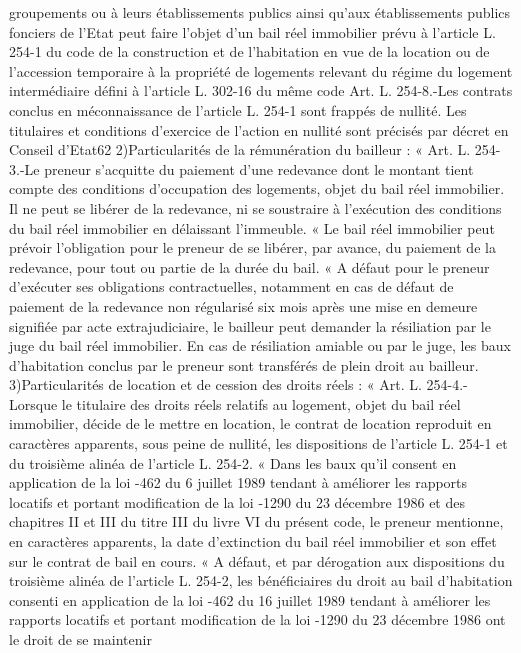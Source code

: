 \documentclass[11pt,a4paper]{report}
\begin{document}
groupements ou à leurs établissements publics ainsi qu'aux établissements publics fonciers de l'Etat peut faire
l'objet d'un bail réel immobilier prévu à l'article L. 254-1 du code de la construction et de l'habitation en vue de
la location ou de l'accession temporaire à la propriété de logements relevant du régime du logement
intermédiaire défini à l'article L. 302-16 du même code
Art. L. 254-8.-Les contrats conclus en méconnaissance de l'article L. 254-1 sont frappés de nullité. Les titulaires
et conditions d'exercice de l'action en nullité sont précisés par décret en Conseil d'Etat62
2)Particularités de la rémunération du bailleur : « Art. L. 254-3.-Le preneur s'acquitte du paiement d'une
redevance dont le montant tient compte des conditions d'occupation des logements, objet du bail réel immobilier.
Il ne peut se libérer de la redevance, ni se soustraire à l'exécution des conditions du bail réel immobilier en
délaissant l'immeuble.
« Le bail réel immobilier peut prévoir l'obligation pour le preneur de se libérer, par avance, du paiement de la
redevance, pour tout ou partie de la durée du bail.
« A défaut pour le preneur d'exécuter ses obligations contractuelles, notamment en cas de défaut de paiement de
la redevance non régularisé six mois après une mise en demeure signifiée par acte extrajudiciaire, le bailleur
peut demander la résiliation par le juge du bail réel immobilier. En cas de résiliation amiable ou par le juge, les
baux d'habitation conclus par le preneur sont transférés de plein droit au bailleur.
3)Particularités de location et de cession des droits réels : « Art. L. 254-4.-Lorsque le titulaire des droits réels
relatifs au logement, objet du bail réel immobilier, décide de le mettre en location, le contrat de location
reproduit en caractères apparents, sous peine de nullité, les dispositions de l'article L. 254-1 et du troisième
alinéa de l'article L. 254-2.
« Dans les baux qu'il consent en application de la loi -462 du 6 juillet 1989 tendant à améliorer les
rapports locatifs et portant modification de la loi -1290 du 23 décembre 1986 et des chapitres II et III du
titre III du livre VI du présent code, le preneur mentionne, en caractères apparents, la date d'extinction du bail
réel immobilier et son effet sur le contrat de bail en cours.
« A défaut, et par dérogation aux dispositions du troisième alinéa de l'article L. 254-2, les bénéficiaires du droit
au bail d'habitation consenti en application de la loi -462 du 16 juillet 1989 tendant à améliorer les
rapports locatifs et portant modification de la loi -1290 du 23 décembre 1986 ont le droit de se maintenir
\end{document}
